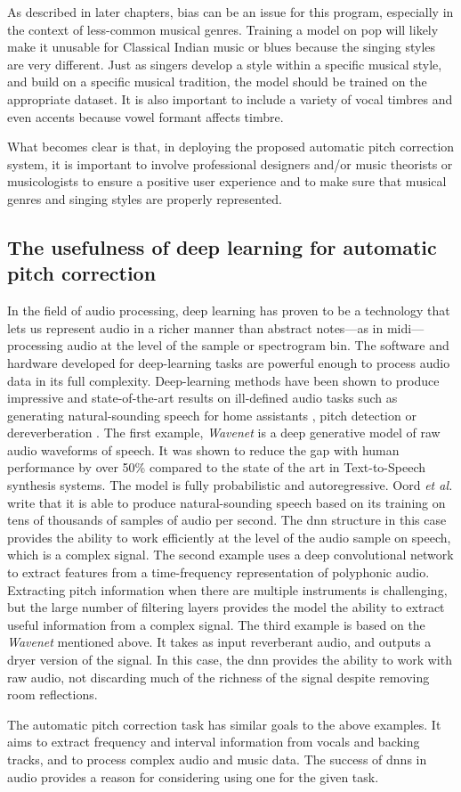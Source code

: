 As described in later chapters, bias can be an issue for this program, especially in the context of less-common musical genres. Training a model on pop will likely make it unusable for Classical Indian music or blues because the singing styles are very different. Just as singers develop a style within a specific musical style, and build on a specific musical tradition, the model should be trained on the appropriate dataset. It is also important to include a variety of vocal timbres and even accents because vowel formant affects timbre. 

What becomes clear is that, in deploying the proposed automatic pitch correction system, it is important to involve professional designers and/or music theorists or musicologists to ensure a positive user experience and to make sure that musical genres and singing styles are properly represented.

\subsection{The usefulness of deep learning for automatic pitch correction}
In the field of audio processing, deep learning has proven to be a technology that lets us represent audio in a richer manner than abstract notes---as in \gls{midi}---processing audio at the level of the sample or spectrogram bin. The software and hardware developed for deep-learning tasks are powerful enough to process audio data in its full complexity. Deep-learning methods have been shown to produce impressive and state-of-the-art results on ill-defined audio tasks such as generating natural-sounding speech for home assistants \cite{oord2016wavenet}, pitch detection \cite{bittner2017deep} or dereverberation \cite{su2020hifi}. The first example, \textit{Wavenet} is a deep generative model of raw audio waveforms of speech. It was shown to reduce the gap with human performance by over 50\% compared to the state of the art in Text-to-Speech synthesis systems. The model is fully probabilistic and autoregressive. Oord \textit{et al.} write that it is able to produce natural-sounding speech based on its training on tens of thousands of samples of audio per second. The \gls{dnn} structure in this case provides the ability to work efficiently at the level of the audio sample on speech, which is a complex signal. The second example uses a deep convolutional network to extract features from a time-frequency representation of polyphonic audio. Extracting pitch information when there are multiple instruments is challenging, but the large number of filtering layers provides the model the ability to extract useful information from a complex signal. The third example is based on the \textit{Wavenet} mentioned above. It takes as input reverberant audio, and outputs a dryer version of the signal. In this case, the \gls{dnn} provides the ability to work with raw audio, not discarding much of the richness of the signal despite removing room reflections.

The automatic pitch correction task has similar goals to the above examples. It aims to extract frequency and interval information from vocals and backing tracks, and to process complex audio and music data. The success of \gls{dnn}s in audio provides a reason for considering using one for the given task.